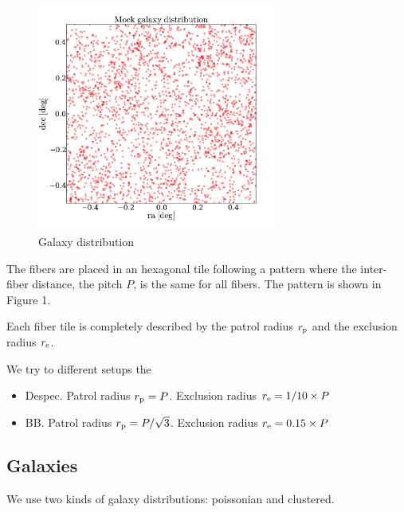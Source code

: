 \documentclass{article}
\begin{document}
\begin{figure}
\begin{center}
\includegraphics[keepaspectratio=true,width=0.7\textwidth]{mock_gals.pdf}
\caption{Galaxy distribution}
\end{center}
\end{figure}

The fibers are placed in an hexagonal tile following a pattern where
the inter-fiber distance, the pitch $P$, is the same for all
fibers. The pattern is shown in Figure 1. 

Each fiber tile is completely described by the patrol radius $r_{\rm
  p}$ and the exclusion radius $r_{\rm e}$.


We try to different setups the 
\begin{itemize}
\item {\rm Despec}. Patrol radius $r_{\rm p}=P$. Exclusion radius
  $r_{\rm e}=1/10\times P$
\item {\rm BB}. Patrol radius $r_{\rm p}=P/\sqrt{3}$. Exclusion radius
  $r_{\rm e}=0.15 \times P$
\end{itemize}

\subsection{Galaxies}
We use two kinds of galaxy distributions: poissonian and clustered. \\ 
\end{document}
